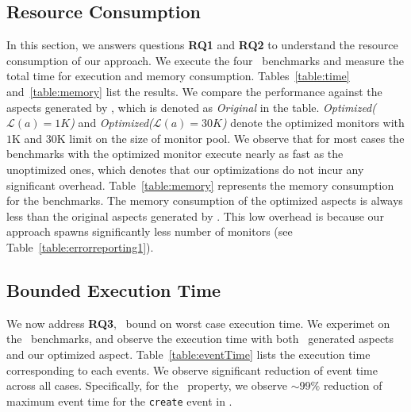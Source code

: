 

\subsection{Resource Consumption}
\label{sec:evaluation:resource}


In this section, we answers questions \textbf{RQ1} and \textbf{RQ2} to 
understand the resource consumption of our approach. We execute the four 
\dacapo\ benchmarks and measure the total time for execution and memory 
consumption. Tables~\ref{table:time} and~\ref{table:memory} list the results.
We compare the performance against the aspects generated by \javamop, which is 
denoted as \emph{Original} in the table. \emph{Optimized($\mathcal{L}(a) = 1K$)} 
and \emph{Optimized($\mathcal{L}(a) = 30K$)} denote the optimized monitors with 
$1$K and $30$K limit on the size of monitor pool. We observe that for most cases 
the benchmarks with the optimized monitor execute nearly as fast as the 
unoptimized ones, which denotes that our optimizations do not incur any 
significant overhead. Table~\ref{table:memory} represents the memory 
consumption for the benchmarks. The memory consumption of the optimized aspects 
is always less than the original aspects generated by \javamop. This low 
overhead is because our approach spawns significantly less number of 
monitors (see Table~\ref{table:errorreporting1}).

\subsection{Bounded Execution Time}
\label{sec:evaluation:bounded}

We now address \textbf{RQ3}, \ie\ bound on worst case execution time. We
experimet on the \dacapo\ benchmarks, and observe the execution time with both
\javamop\ generated aspects and our optimized aspect. 
Table~\ref{table:eventTime} lists  the execution time corresponding to each
events. We observe significant reduction of event time across all cases.
Specifically, for the \unsafeiter\ property, we observe $\sim$$99\%$ reduction
of maximum event time for the \texttt{create} event in \bloat.

